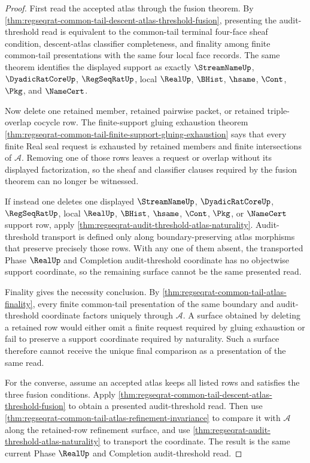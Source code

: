 \begin{proof}
First read the accepted atlas through the fusion theorem. By \autoref{thm:regseqrat-common-tail-descent-atlas-threshold-fusion}, presenting the audit-threshold read is equivalent to the common-tail terminal four-face sheaf condition, descent-atlas classifier completeness, and finality among finite common-tail presentations with the same four local face records. The same theorem identifies the displayed support as exactly $\StreamNameUp$, $\DyadicRatCoreUp$, $\RegSeqRatUp$, local $\RealUp$, $\BHist$, $\hsame$, $\Cont$, $\Pkg$, and $\NameCert$.

Now delete one retained member, retained pairwise packet, or retained triple-overlap cocycle row. The finite-support gluing exhaustion theorem \autoref{thm:regseqrat-common-tail-finite-support-gluing-exhaustion} says that every finite Real seal request is exhausted by retained members and finite intersections of $\mathcal A$. Removing one of those rows leaves a request or overlap without its displayed factorization, so the sheaf and classifier clauses required by the fusion theorem can no longer be witnessed.

If instead one deletes one displayed $\StreamNameUp$, $\DyadicRatCoreUp$, $\RegSeqRatUp$, local $\RealUp$, $\BHist$, $\hsame$, $\Cont$, $\Pkg$, or $\NameCert$ support row, apply \autoref{thm:regseqrat-audit-threshold-atlas-naturality}. Audit-threshold transport is defined only along boundary-preserving atlas morphisms that preserve precisely those rows. With any one of them absent, the transported Phase $\RealUp$ and Completion audit-threshold coordinate has no objectwise support coordinate, so the remaining surface cannot be the same presented read.

Finality gives the necessity conclusion. By \autoref{thm:regseqrat-common-tail-atlas-finality}, every finite common-tail presentation of the same boundary and audit-threshold coordinate factors uniquely through $\mathcal A$. A surface obtained by deleting a retained row would either omit a finite request required by gluing exhaustion or fail to preserve a support coordinate required by naturality. Such a surface therefore cannot receive the unique final comparison as a presentation of the same read.

For the converse, assume an accepted atlas keeps all listed rows and satisfies the three fusion conditions. Apply \autoref{thm:regseqrat-common-tail-descent-atlas-threshold-fusion} to obtain a presented audit-threshold read. Then use \autoref{thm:regseqrat-common-tail-atlas-refinement-invariance} to compare it with $\mathcal A$ along the retained-row refinement surface, and use \autoref{thm:regseqrat-audit-threshold-atlas-naturality} to transport the coordinate. The result is the same current Phase $\RealUp$ and Completion audit-threshold read.


\end{proof}

